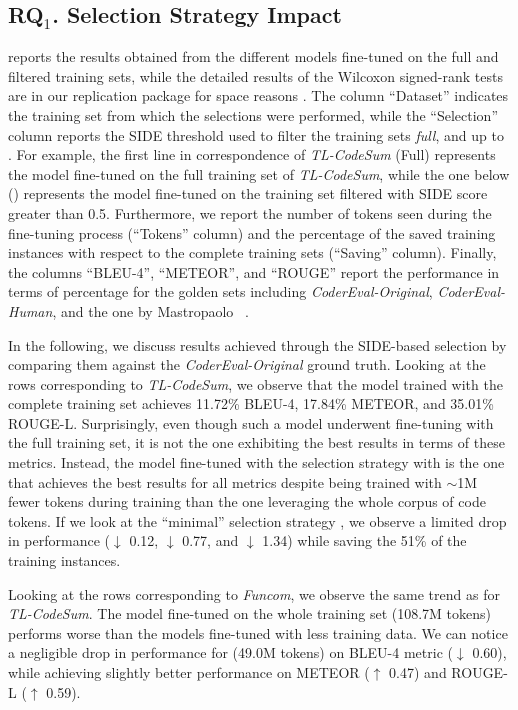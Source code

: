 \subsection{RQ$_{1}$. Selection Strategy Impact}
\label{rq1}
 reports the results obtained from the different models fine-tuned on the full and filtered training sets, while the detailed results of the Wilcoxon signed-rank tests are in our replication package for space reasons \cite{replicationpackage}. The column ``Dataset'' indicates the training set from which the selections were performed, while the ``Selection'' column reports the SIDE threshold used to filter the training sets \ie \textit{full}, and  up to . For example, the first line in correspondence of \textit{TL-CodeSum} (\ie Full) represents the model fine-tuned on the full training set of \textit{TL-CodeSum}, while the one below \ie () represents the model fine-tuned on the training set filtered with SIDE score greater than 0.5.
Furthermore, we report the number of tokens seen during the fine-tuning process (``Tokens'' column) and the percentage of the saved training instances with respect to the complete training sets (``Saving'' column).
Finally, the columns ``BLEU-4'', ``METEOR'', and ``ROUGE'' report the performance in terms of percentage for the golden sets including \textit{CoderEval-Original}, \textit{CoderEval-Human}, and the one by Mastropaolo \etal~\cite{mastropaolo2023robustness}.


In the following, we discuss results achieved through the SIDE-based selection by comparing them against the \textit{CoderEval-Original} ground truth.
Looking at the rows corresponding to \textit{TL-CodeSum}, we observe that the model trained with the complete training set achieves 11.72\% BLEU-4, 17.84\% METEOR, and 35.01\% ROUGE-L. Surprisingly, even though such a model underwent fine-tuning with the full training set, it is not the one exhibiting the best results in terms of these metrics. Instead, the model fine-tuned with the selection strategy with  is the one that achieves the best results for all metrics despite being trained with $\sim$1M fewer tokens during training than the one leveraging the whole corpus of code tokens. If we look at the ``minimal'' selection strategy \ie {}, we observe a limited drop in performance ($\downarrow$ 0.12, $\downarrow$ 0.77, and $\downarrow$ 1.34) while saving the 51\% of the training instances.

Looking at the rows corresponding to \textit{Funcom}, we observe the same trend as for \textit{TL-CodeSum}. The model fine-tuned on the whole training set (108.7M tokens) performs worse than the models fine-tuned with less training data. We can notice a negligible drop in performance for  (49.0M tokens) on BLEU-4 metric ($\downarrow$ 0.60), while achieving slightly better performance on METEOR ($\uparrow$ 0.47) and ROUGE-L ($\uparrow$ 0.59).

